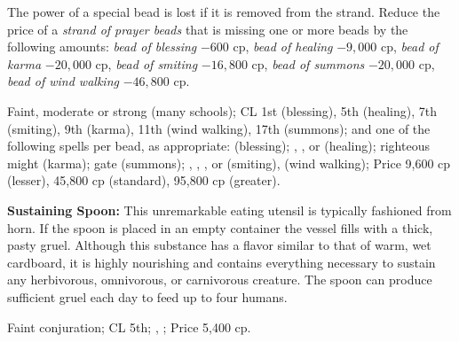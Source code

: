 The power of a special bead is lost if it is removed from the strand. Reduce the price of a \emph{strand of prayer beads} that is missing one or more beads by the following amounts: \emph{bead of blessing} $-600$ cp, \emph{bead of healing} $-9,000$ cp, \emph{bead of karma} $-20,000$ cp, \emph{bead of smiting} $-16,800$ cp, \emph{bead of summons} $-20,000$ cp, \emph{bead of wind walking} $-46,800$ cp.

Faint, moderate or strong (many schools); CL 1st (blessing), 5th (healing), 7th (smiting), 9th (karma), 11th (wind walking), 17th (summons);  and one of the following spells per bead, as appropriate:  (blessing); , , or  (healing); righteous might (karma); gate (summons); , , , or  (smiting),  (wind walking); Price 9,600 cp (lesser), 45,800 cp (standard), 95,800 cp (greater).



\textbf{Sustaining Spoon:} This unremarkable eating utensil is typically fashioned from horn. If the spoon is placed in an empty container the vessel fills with a thick, pasty gruel. Although this substance has a flavor similar to that of warm, wet cardboard, it is highly nourishing and contains everything necessary to sustain any herbivorous, omnivorous, or carnivorous creature. The spoon can produce sufficient gruel each day to feed up to four humans.

Faint conjuration; CL 5th; , ; Price 5,400 cp.







